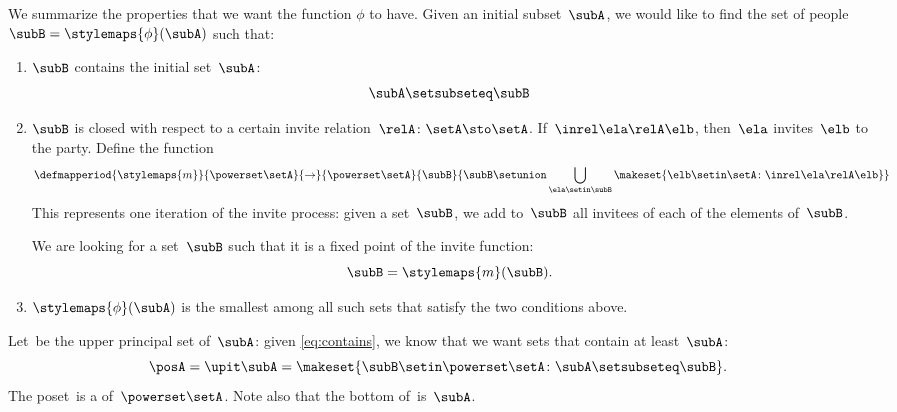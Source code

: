 We summarize the properties that we want the function $\phi$ to have.
Given an initial subset~$\subA$, we would like to find the set of people~$\subB = \stylemaps{\phi}(\subA)$ such that:
\begin{enumerate}
    \item $\subB$ contains the initial set~$\subA$:
          \begin{equation}
              \label{eq:contains}
              \subA \setsubseteq \subB
          \end{equation}
    \item $\subB$ is closed with respect to a certain invite relation~$\relA \colon \setA \sto \setA$.
          If~$\inrel \ela \relA \elb$, then~$\ela$ invites~$\elb$ to the party.
          Define the function
          \begin{equation}
              \defmapperiod{\stylemaps{m}}{\powerset \setA}{\to}{\powerset \setA
              }{
                  \subB
              }{
                  \subB \setunion \bigcup_{\ela \setin \subB} \makeset{ \elb \setin \setA \colon \inrel \ela \relA \elb}
              }
          \end{equation}
          This represents one iteration of the invite process: given a set~$\subB$, we add to~$\subB$ all invitees of each of the elements of~$\subB$.

          We are looking for a set~$\subB$ such that it is a fixed point of the invite function:
          \begin{equation}
              \subB = \stylemaps{m}(\subB).
          \end{equation}

    \item $\stylemaps{\phi}(\subA)$ is the smallest among all such sets that satisfy the two conditions above.
\end{enumerate}

Let~\posA be the upper principal set of~$\subA$: given \cref{eq:contains}, we know that we want sets that contain at least~$\subA$:
\begin{equation}
    \posA = \upit \subA  = \makeset{ \subB \setin \powerset \setA \colon \subA \setsubseteq \subB }.
\end{equation}
The poset~\posA is a  of~$\powerset \setA$.
Note also that the bottom of~\posA is~$\subA$.

